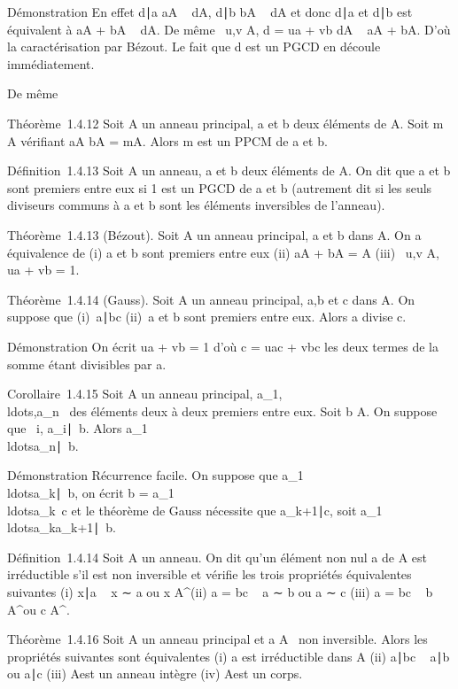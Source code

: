 Démonstration En effet d∣a
\Leftrightarrow aA \subset~ dA, d\mathrel∣b
\Leftrightarrow bA \subset~ dA et donc
d∣a et d\mathrel∣b est
équivalent à aA + bA \subset~ dA. De même \exists~u,v \in A, d
= ua + vb \Leftrightarrow dA \subset~ aA + bA. D'où la
caractérisation par Bézout. Le fait que d est un PGCD en découle
immédiatement.

De même

Théorème~1.4.12 Soit A un anneau principal, a et b deux éléments de A.
Soit m \in A vérifiant aA \bigcap bA = mA. Alors m est un PPCM de a et b.

Définition~1.4.13 Soit A un anneau, a et b deux éléments de A. On dit
que a et b sont premiers entre eux si 1 est un PGCD de a et b (autrement
dit si les seuls diviseurs communs à a et b sont les éléments
inversibles de l'anneau).

Théorème~1.4.13 (Bézout). Soit A un anneau principal, a et b dans A. On
a équivalence de (i) a et b sont premiers entre eux (ii) aA + bA = A
(iii) \exists~u,v \in A, ua + vb = 1.

Théorème~1.4.14 (Gauss). Soit A un anneau principal, a,b et c dans A. On
suppose que (i)~a∣bc (ii)~a et b sont
premiers entre eux. Alors a divise c.

Démonstration On écrit ua + vb = 1 d'où c = uac + vbc les deux termes de
la somme étant divisibles par a.

Corollaire~1.4.15 Soit A un anneau principal,
a_1,\\ldots,a_n~
des éléments deux à deux premiers entre eux. Soit b \in A. On suppose que
\forall~i, a_i\mathrel∣~b.
Alors
a_1\\ldotsa_n\mathrel∣~b.

Démonstration Récurrence facile. On suppose que
a_1\\ldotsa_k\mathrel∣~b,
on écrit b =
a_1\\ldotsa_k~c
et le théorème de Gauss nécessite que
a_k+1∣c, soit
a_1\\ldotsa_ka_k+1\mathrel∣~b.

Définition~1.4.14 Soit A un anneau. On dit qu'un élément non nul a de A
est irréductible s'il est non inversible et vérifie les trois propriétés
équivalentes suivantes (i) x∣a \rigtharrow~ x ∼ a ou x \in
A^\times (ii) a = bc \rigtharrow~ a ∼ b ou a ∼ c (iii) a = bc \rigtharrow~ b \in
A^\times ou c \in A^\times.

Théorème~1.4.16 Soit A un anneau principal et a \in A
\diagdown\0\ non inversible. Alors les
propriétés suivantes sont équivalentes (i) a est irréductible dans A
(ii) a∣bc \rigtharrow~ a\mathrel∣b ou
a∣c (iii) A\diagupaA est un anneau intègre (iv)
A\diagupaA est un corps.

